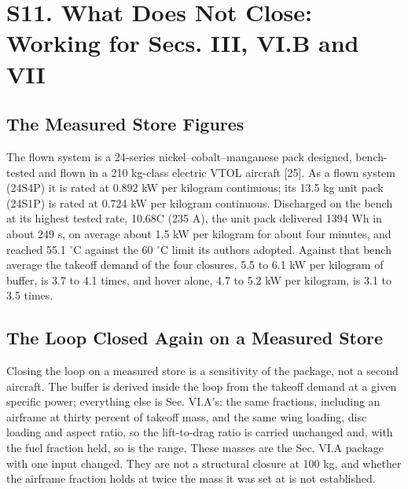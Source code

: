\documentclass[journal]{new-aiaa}
\begin{document}
\section*{S11. What Does Not Close: Working for Secs. III, VI.B and VII}

\subsection*{The Measured Store Figures}

The flown system is a 24-series nickel--cobalt--manganese pack designed, bench-tested and flown in a 210 kg-class electric VTOL aircraft [25]. As a flown system (24S4P) it is rated at 0.892 kW per kilogram continuous; its 13.5 kg unit pack (24S1P) is rated at 0.724 kW per kilogram continuous. Discharged on the bench at its highest tested rate, 10.68C (235 A), the unit pack delivered 1394 Wh in about 249 s, on average about 1.5 kW per kilogram for about four minutes, and reached 55.1 $^\circ$C against the 60 $^\circ$C limit its authors adopted. Against that bench average the takeoff demand of the four closures, 5.5 to 6.1 kW per kilogram of buffer, is 3.7 to 4.1 times, and hover alone, 4.7 to 5.2 kW per kilogram, is 3.1 to 3.5 times.

\subsection*{The Loop Closed Again on a Measured Store}

Closing the loop on a measured store is a sensitivity of the package, not a second aircraft. The buffer is derived inside the loop from the takeoff demand at a given specific power; everything else is Sec. VI.A's: the same fractions, including an airframe at thirty percent of takeoff mass, and the same wing loading, disc loading and aspect ratio, so the lift-to-drag ratio is carried unchanged and, with the fuel fraction held, so is the range. These masses are the Sec. VI.A package with one input changed. They are not a structural closure at 100 kg, and whether the airframe fraction holds at twice the mass it was set at is not established.
\end{document}
